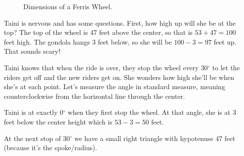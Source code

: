 \begin{figure}[htbp]
{
           }
    \caption{Dimensions of a Ferris Wheel.} 
    \label{fig_ferris}
\end{figure}

Taini is nervous and has some questions.  First, how high up will she be at the top?  The top of the wheel is 47 feet above the center, so that is $53 + 47 = 100$ feet high.  The gondola hangs 3 feet below, so she will be $100-3 = 97$ feet up.  That sounds scary!

Taini knows that when the ride is over, they stop the wheel every 30$^\circ$ to let the riders get off and the new riders get on.  She wonders how high she'll be when she's at each point. Let's measure the angle in standard measure, meaning counterclockwise from the horizontal line through the center. 

Taini is at exactly 0$^\circ$ when they first stop the wheel.  At that angle, she is at 3 feet below the center height which is $53-3= 50 \text{ feet}$.  

At the next stop of 30$^\circ$ we have a small right triangle with hypotenuse 47 feet (because it's the spoke/radius).

\begin{center}
\end{center}

